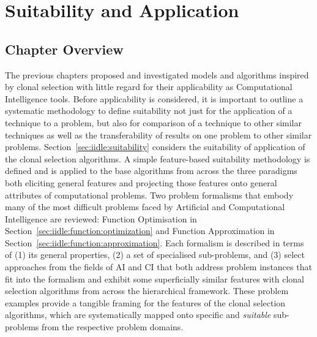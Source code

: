 %
%
\chapter{Suitability and Application}
\label{chap:iidle}

%
%
\section{Chapter Overview}
\label{sec:iidle:overview}
The previous chapters proposed and investigated models and algorithms inspired by clonal selection with little regard for their applicability as Computational Intelligence tools. Before applicability is considered, it is important to outline a systematic methodology to define suitability not just for the application of a technique to a problem, but also for comparison of a technique to other similar techniques as well as the transferability of results on one problem to other similar problems.
Section~\ref{sec:iidle:suitability} considers the suitability of application of the clonal selection algorithms. A simple feature-based suitability methodology is defined and is applied to the base algorithms from across the three paradigms both eliciting general features and projecting those features onto general attributes of computational problems.
Two problem formalisms that embody many of the most difficult problems faced by Artificial and Computational Intelligence are reviewed: Function Optimisation in Section~\ref{sec:iidle:function:optimization} and Function Approximation in Section~\ref{sec:iidle:function:approximation}. Each formalism is described in terms of (1) its general properties, (2) a set of specialised sub-problems, and (3) select approaches from the fields of AI and CI that both address problem instances that fit into the formalism and exhibit some superficially similar features with clonal selection algorithms from across the hierarchical framework. These problem examples provide a tangible framing for the features of the clonal selection algorithms, which are systematically mapped onto specific and \emph{suitable} sub-problems from the respective problem domains.

%
%
